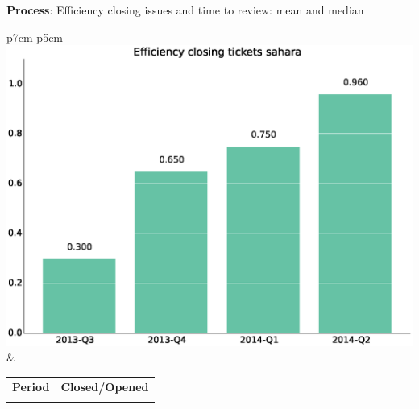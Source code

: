\documentclass[a4wide,11pt]{report}
\begin{document}
\textbf{Process}: Efficiency closing issues and time to review: mean and median

\begin{tabular}{p{7cm} p{5cm}}
    \vspace{0pt} 
    \includegraphics[scale=.35]{figs/bmisahara.eps}
    & 
    \vspace{0pt}
    \begin{tabular}{l|l}%
    \bfseries Period & \bfseries Closed/Opened %
    \csvreader[head to column names]{data/bmisahara.csv}{}%
    {\\ & \bmi}
    \end{tabular}
\end{tabular}
\end{document}
